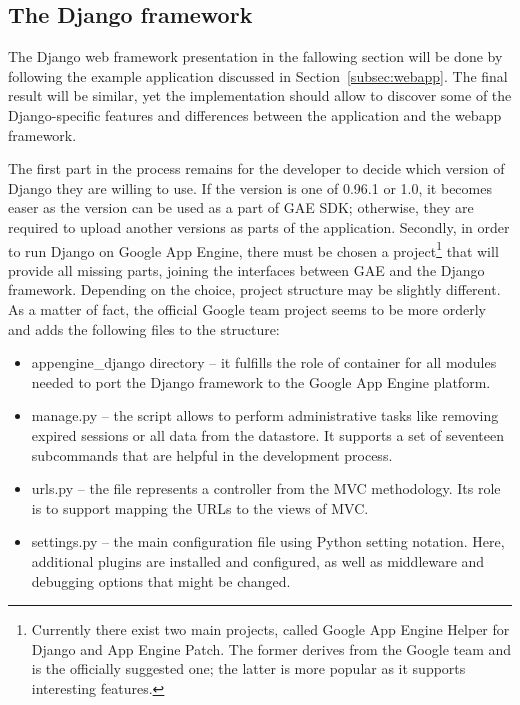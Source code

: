 \subsection{The Django framework}\label{subsec:django}
The Django web framework presentation in the fallowing section will be done by following the example application discussed in Section~\ref{subsec:webapp}. The final result will be similar, yet the implementation should allow to discover some of the Django-specific features and differences between the application and the webapp framework. 

The first part in the process remains for the developer to decide which version of Django they are willing to use. If the version is one of 0.96.1 or 1.0, it becomes easer as the version can be used as a part of GAE SDK; otherwise, they are required to upload another versions as parts of the application. Secondly, in order to run Django on Google App Engine, there must be chosen a project\footnote{Currently there exist two main projects, called Google App Engine Helper for Django and App Engine Patch. The former derives from the Google team and is the officially suggested one; the latter is more popular as it supports interesting features.} that will provide all missing parts, joining the interfaces between GAE and the Django framework. Depending on the choice, project structure may be slightly different. As a matter of fact, the official Google team project seems to be more orderly and adds the following files to the structure:
\begin{itemize}
\item{appengine\_django directory -- it fulfills the role of container for all modules needed to port the Django framework to the Google App Engine platform.}
\item{manage.py -- the script allows to perform administrative tasks like removing expired sessions or all data from the datastore. It supports a set of seventeen subcommands that are helpful in the development process.}
\item{urls.py -- the file represents a controller from the MVC methodology. Its role is to support mapping the URLs to the views of MVC.}
\item{settings.py -- the main configuration file using Python setting notation. Here, additional plugins are installed and configured, as well as middleware and debugging options that might be changed.}
\end{itemize}
